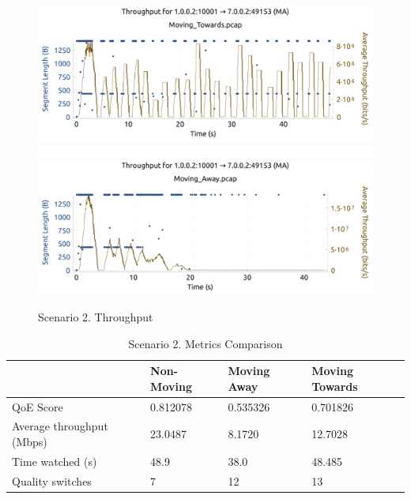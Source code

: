 \begin{figure}[h]
    \centering    
    \includegraphics[width=\textwidth]{img/s2c2_1.pdf}
    \includegraphics[width=\textwidth]{img/space.png}
    \includegraphics[width=\textwidth]{img/s2c2_2.pdf}
    \caption{Scenario 2. Throughput}
    \label{fig:s2c2}
\end{figure}


\begin{table}[]
    \centering
    \begin{tabular}{@{}llll@{}}
    \toprule
                              & Non-Moving & Moving Away & Moving Towards \\ \midrule
    QoE Score                 & 0.812078   & 0.535326    & 0.701826       \\
    Average throughput (Mbps) & 23.0487    & 8.1720      & 12.7028        \\
    Time watched (s)          & 48.9       & 38.0        & 48.485         \\
    Quality switches          & 7          & 12          & 13             \\ \bottomrule
    \end{tabular}
    \caption{Scenario 2. Metrics Comparison}
    \label{table:s2t1}
\end{table}



